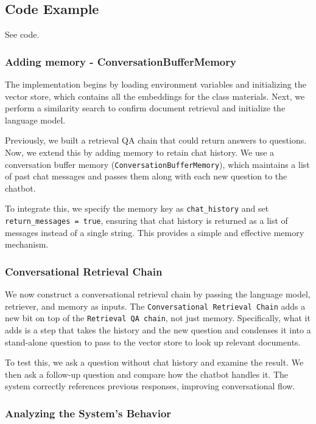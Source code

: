 \documentclass{article}
\begin{document}
\subsection{Code Example}

See code.

\subsubsection{Adding memory - ConversationBufferMemory}

The implementation begins by loading environment variables and initializing the vector store, which contains all the embeddings for the class materials. Next, we perform a similarity search to confirm document retrieval and initialize the language model.

Previously, we built a retrieval QA chain that could return answers to questions. Now, we extend this by adding memory to retain chat history. We use a conversation buffer memory (\texttt{ConversationBufferMemory}), which maintains a list of past chat messages and passes them along with each new question to the chatbot.

To integrate this, we specify the memory key as \texttt{chat\_history} and set \texttt{return\_messages = true}, ensuring that chat history is returned as a list of messages instead of a single string. This provides a simple and effective memory mechanism.

\subsubsection{Conversational Retrieval Chain}

We now construct a conversational retrieval chain by passing the language model, retriever, and memory as inputs. The \texttt{Conversational Retrieval Chain} adds a new bit on top of the \texttt{Retrieval QA chain}, not just memory. Specifically, what it adds is a step that takes the history and the new question and condenses it into a stand-alone question to pass to the vector store to look up relevant documents.

To test this, we ask a question without chat history and examine the result. We then ask a follow-up question and compare how the chatbot handles it. The system correctly references previous responses, improving conversational flow.

\subsubsection{Analyzing the System's Behavior}
\end{document}
